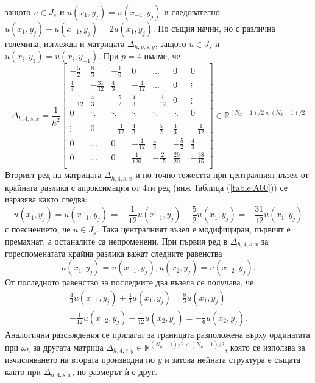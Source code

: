 \documentclass{article}
\newcommand{\rf}[1]{(\ref{#1})}
\newcommand{\RR}{\mathbb{R}}
\begin{document}
защото $u \in J_s$ и $u(x_1, y_j) = u(x_{-1}, y_j)$ и следователно $u(x_1, y_j) + u(x_{-1}, y_j) = 2 u(x_1, y_j)$. По същия начин, но с различна големина, изглежда и матрицата $\Delta_{h,p,s,y}$, защото $u \in J_s$ и $u(x_i, y_1) = u(x_i, y_{-1})$.  При $p=4$ имаме, че 
\[
\Delta_{h,4,s,x} = \frac{1}{h^2}
\begin{bmatrix}
     -\frac{5}{2}	& \frac{8}{3}       & -\frac{1}{6}	&    0     			&    \dots      	   &   0           & 0    \\
    \frac{4}{3}          &-\frac{31}{12}    	& \frac{4}{3}	&   -\frac{1}{12}	  	&   \dots      	  &   0	           & \vdots  \\
    -\frac{1}{12}	& \frac{4}{3}         	& -\frac{5}{2}	&  \frac{4}{3}    	 &   -\frac{1}{12}	  &      0           &\vdots    \\
        0           		& \ddots        	&    \ddots   		 &   \ddots      	 &     \ddots      	  &  \ddots        &    0 \\	
\\
   \vdots      		 & 0           		 &  -\frac{1}{12}	& \frac{4}{3}    	& -\frac{5}{2}	&  \frac{4}{3}   &   -\frac{1}{12} \\
    0      		 &  \dots           	 &   0     		& -\frac{1}{12} 	 & \frac{4}{3} 	 & -\frac{5}{2}  &  \frac{4}{3}\\
    0              		 & \dots          	&  0              		 &\frac{1}{120} 	 &  -\frac{2}{15} 	& \frac{29}{20} & -\frac{38}{15}\\
\end{bmatrix}
 \in \RR^{(N_x-1)/2 \times (N_x-1)/2}
\]
Вторият ред на матрицата $\Delta_{h,4,s,x}$ и по точно тежестта при централният възел от крайната разлика с апроксимация от 4ти ред (виж Таблица \rf{table:A00}) се изразява както следва:
$$u(x_1, y_j) = u(x_{-1}, y_j) \Rightarrow -\frac{1}{12}u(x_{-1}, y_j) -\frac{5}{2}u(x_1, y_j) = -\frac{31}{12}u(x_1, y_j) $$
с пояснението, че $u \in J_s$. Така централният възел е модифициран, първият е премахнат, а останалите са непроменени. При първия ред в $\Delta_{h,4,s,x}$ за гореспоменатата крайна разлика важат следните равенства
$$u(x_1, y_j) = u(x_{-1}, y_j), u(x_2, y_j) = u(x_{-2}, y_j).$$
От последното равенство за последните два възела се получава, че:
\begin{align}
\frac{4}{3}u(x_{-1}, y_j) +\frac{4}{3}u(x_1, y_j) = \frac{8}{3}u(x_1, y_j) \nonumber\\
-\frac{1}{12}u(x_{-2}, y_j) -\frac{1}{12}u(x_2, y_j) = -\frac{1}{6}u(x_2, y_j). \nonumber
\end{align}
Аналогични разсъждения се прилагат за границата разположена върху ординатата при $\omega_h$ за другата матрица $\Delta_{h,4,s,y} \in \RR^{(N_y-1)/2 \times (N_y-1)/2}$, която се използва за изчисляването на втората производна по $y$ и затова нейната структура е същата както при $\Delta_{h,4,s,x}$, но размерът ѝ е друг.
\end{document}
